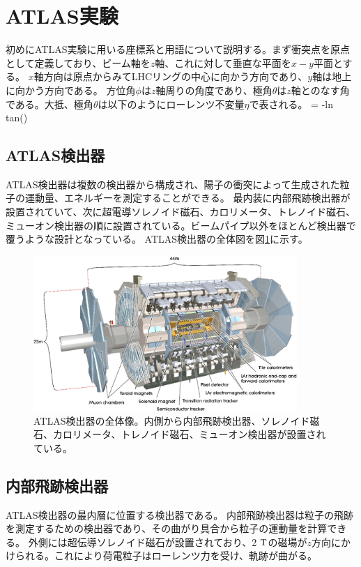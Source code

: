 \section{ATLAS実験}
初めにATLAS実験に用いる座標系と用語について説明する。まず衝突点を原点として定義しており、ビーム軸を$z$軸、これに対して垂直な平面を$x-y$平面とする。
$x$軸方向は原点からみてLHCリングの中心に向かう方向であり、$y$軸は地上に向かう方向である。
方位角$\phi$は$z$軸周りの角度であり、極角$\theta$は$z$軸とのなす角である。大抵、極角$\theta$は以下のようにローレンツ不変量$\eta$で表される。
\bbb
\eta = -\rm{ln tan\left(\right)}
\eee


\subsection{ATLAS検出器}
ATLAS検出器は複数の検出器から構成され、陽子の衝突によって生成された粒子の運動量、エネルギーを測定することができる。
最内装に内部飛跡検出器が設置されていて、次に超電導ソレノイド磁石、カロリメータ、トレノイド磁石、ミューオン検出器の順に設置されている。ビームパイプ以外をほとんど検出器で覆うような設計となっている。
ATLAS検出器の全体図を図\ref{atlas_detector}に示す。

\begin{figure}[bpt]\centering
\includegraphics[width=10cm]{atlas_detector}
\caption[ATLAS検出器の全体像]{ATLAS検出器の全体像\cite{1-2}。内側から内部飛跡検出器、ソレノイド磁石、カロリメータ、トレノイド磁石、ミューオン検出器が設置されている。}
\label{atlas_detector}
\end{figure}


\subsection{内部飛跡検出器}
ATLAS検出器の最内層に位置する検出器である。
内部飛跡検出器は粒子の飛跡を測定するための検出器であり、その曲がり具合から粒子の運動量を計算できる。
外側には超伝導ソレノイド磁石が設置されており、2 $\rm{T}$の磁場が$z$方向にかけられる。これにより荷電粒子はローレンツ力を受け、軌跡が曲がる。

